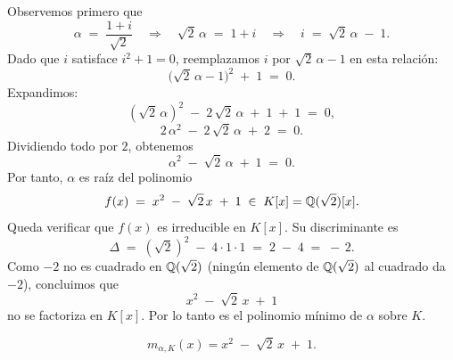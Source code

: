 \begin{solucion}
Observemos primero que
\[
\alpha \;=\;\frac{1 + i}{\sqrt{2}}
\quad\Longrightarrow\quad
\sqrt{2}\,\alpha \;=\; 1 + i
\quad\Longrightarrow\quad
i \;=\;\sqrt{2}\,\alpha \;-\; 1.
\]
Dado que \(i\) satisface \(i^2 + 1 = 0\), reemplazamos \(i\) por \(\sqrt{2}\,\alpha - 1\) en esta relación:
\[
\bigl(\sqrt{2}\,\alpha - 1\bigr)^2 \;+\; 1 \;=\; 0.
\]
Expandimos:
\[
(\sqrt{2}\,\alpha)^2 \;-\; 2\,\sqrt{2}\,\alpha \;+\; 1 \;+\; 1 \;=\; 0,
\]
\[
2\,\alpha^2 \;-\; 2\,\sqrt{2}\,\alpha \;+\; 2 \;=\; 0.
\]
Dividiendo todo por \(2\), obtenemos
\[
\alpha^2 \;-\; \sqrt{2}\,\alpha \;+\; 1 \;=\; 0.
\]
Por tanto, \(\alpha\) es raíz del polinomio
\[
f(x)
\;=\;
x^2 \;-\; \sqrt{2}\,x \;+\; 1 \;\in\;K[x]=\mathbb{Q}(\sqrt{2})[x].
\]
Queda verificar que $f(x)$ es irreducible en \(K[x]\). Su discriminante es
\[
\Delta \;=\; (\sqrt{2})^2 \;-\; 4\cdot1\cdot1
\;=\; 2 \;-\; 4
\;=\; -\,2.
\]
Como \(-2\) no es cuadrado en \(\mathbb{Q}(\sqrt{2})\) (ningún elemento de \(\mathbb{Q}(\sqrt{2})\) al cuadrado da \(-2\)), concluimos que 
\[
x^2 \;-\; \sqrt{2}\,x \;+\; 1
\]
no se factoriza en \(K[x]\). Por lo tanto es el polinomio mínimo de \(\alpha\) sobre \(K\).

\[
\boxed{m_{\alpha,K}(x)=x^2 \;-\; \sqrt{2}\,x \;+\; 1.}
\]
\end{solucion}